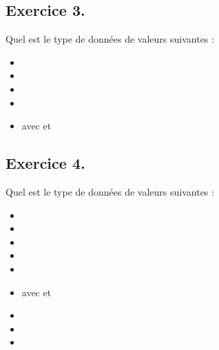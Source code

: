 \documentclass[letterpaper,10pt,french]{sphinxmanual}
\begin{document}
\subsection{Exercice 3.}
\label{\detokenize{exo1:exercice-3}}
\sphinxAtStartPar
Quel est le type de données de valeurs suivantes :
\begin{itemize}
\item {} 
\sphinxAtStartPar
{}

\item {} 
\sphinxAtStartPar
{}

\item {} 
\sphinxAtStartPar
{}

\item {} 
\sphinxAtStartPar
{}

\item {} 
\sphinxAtStartPar
{} avec  et 

\end{itemize}

\begin{sphinxVerbatim}[commandchars=\\\{\}]
\end{sphinxVerbatim}




\subsection{Exercice 4.}
\label{\detokenize{exo1:exercice-4}}
\sphinxAtStartPar
Quel est le type de données de valeurs suivantes :
\begin{itemize}
\item {} 
\sphinxAtStartPar
{}

\item {} 
\sphinxAtStartPar
{}

\item {} 
\sphinxAtStartPar
{}

\item {} 
\sphinxAtStartPar
{}

\item {} 
\sphinxAtStartPar
{}

\item {} 
\sphinxAtStartPar
{} avec  et 

\item {} 
\sphinxAtStartPar
{}

\item {} 
\sphinxAtStartPar
{}

\item {} 
\sphinxAtStartPar
{}

\end{itemize}
\end{document}
